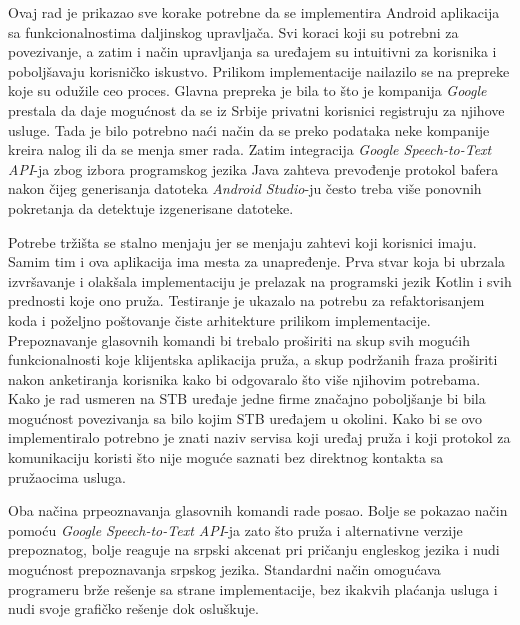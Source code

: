 \documentclass[TamaraIvanovicMasterRad.tex]{subfiles}
\begin{document}
Ovaj rad je prikazao sve korake potrebne da se implementira Android aplikacija sa funkcionalnostima daljinskog upravljača. Svi koraci koji su potrebni za povezivanje, a zatim i način upravljanja sa uređajem su intuitivni za korisnika i poboljšavaju korisničko iskustvo. Prilikom implementacije nailazilo se na prepreke koje su odužile ceo proces. Glavna prepreka je bila to što je kompanija \textit{Google} prestala da daje mogućnost da se iz Srbije privatni korisnici registruju za njihove usluge. Tada je bilo potrebno naći način da se preko podataka neke kompanije kreira nalog ili da se menja smer rada. Zatim integracija \textit{Google Speech-to-Text API}-ja zbog izbora programskog jezika Java zahteva prevođenje protokol bafera nakon čijeg generisanja datoteka \textit{Android Studio}-ju često treba više ponovnih pokretanja da detektuje izgenerisane datoteke. 

Potrebe tržišta se stalno menjaju jer se menjaju zahtevi koji korisnici imaju. Samim tim i ova aplikacija ima mesta za unapređenje. Prva stvar koja bi ubrzala izvršavanje i olakšala implementaciju je prelazak na programski jezik Kotlin i svih prednosti koje ono pruža. Testiranje je ukazalo na potrebu za refaktorisanjem koda i poželjno poštovanje čiste arhitekture prilikom implementacije. Prepoznavanje glasovnih komandi bi trebalo proširiti na skup svih mogućih funkcionalnosti koje klijentska aplikacija pruža, a skup podržanih fraza proširiti nakon anketiranja korisnika kako bi odgovaralo što više njihovim potrebama. Kako je rad usmeren na STB uređaje jedne firme značajno poboljšanje bi bila mogućnost povezivanja sa bilo kojim STB uređajem u okolini. Kako bi se ovo implementiralo potrebno je znati naziv servisa koji uređaj pruža i koji protokol za komunikaciju koristi što nije moguće saznati bez direktnog kontakta sa pružaocima usluga.

Oba načina prpeoznavanja glasovnih komandi rade posao. Bolje se pokazao način pomoću \textit{Google Speech-to-Text API}-ja zato što pruža i alternativne verzije prepoznatog, bolje reaguje na srpski akcenat pri pričanju engleskog jezika i nudi mogućnost prepoznavanja srpskog jezika. Standardni način omogućava programeru brže rešenje sa strane implementacije, bez ikakvih plaćanja usluga i nudi svoje grafičko rešenje dok osluškuje. 
\end{document}
